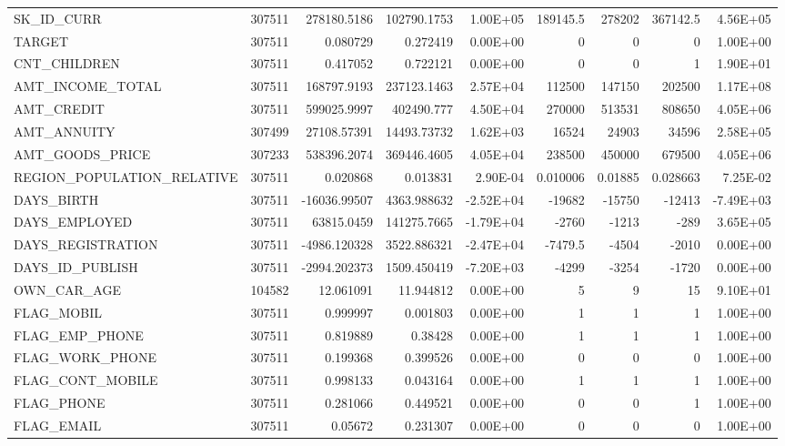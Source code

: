 \documentclass[12pt, letterpaper]{article}
\begin{document}
\begin{appendices}
{\begin{longtable}[c]{| l || r | r | r | r | r | r | r | r |}
 \hline
 \endfoot

 \hline
 \endlastfoot

 SK_ID_CURR	&	307511	&	278180.5186	&	102790.1753	&	1.00E+05	&	189145.5	&	278202	&	367142.5	&	4.56E+05	\\
 TARGET	&	307511	&	0.080729	&	0.272419	&	0.00E+00	&	0	&	0	&	0	&	1.00E+00	\\
 CNT_CHILDREN	&	307511	&	0.417052	&	0.722121	&	0.00E+00	&	0	&	0	&	1	&	1.90E+01	\\
 AMT_INCOME_TOTAL	&	307511	&	168797.9193	&	237123.1463	&	2.57E+04	&	112500	&	147150	&	202500	&	1.17E+08	\\
 AMT_CREDIT	&	307511	&	599025.9997	&	402490.777	&	4.50E+04	&	270000	&	513531	&	808650	&	4.05E+06	\\
 AMT_ANNUITY	&	307499	&	27108.57391	&	14493.73732	&	1.62E+03	&	16524	&	24903	&	34596	&	2.58E+05	\\
 AMT_GOODS_PRICE	&	307233	&	538396.2074	&	369446.4605	&	4.05E+04	&	238500	&	450000	&	679500	&	4.05E+06	\\
 REGION_POPULATION_RELATIVE	&	307511	&	0.020868	&	0.013831	&	2.90E-04	&	0.010006	&	0.01885	&	0.028663	&	7.25E-02	\\
 DAYS_BIRTH	&	307511	&	-16036.99507	&	4363.988632	&	-2.52E+04	&	-19682	&	-15750	&	-12413	&	-7.49E+03	\\
 DAYS_EMPLOYED	&	307511	&	63815.0459	&	141275.7665	&	-1.79E+04	&	-2760	&	-1213	&	-289	&	3.65E+05	\\
 DAYS_REGISTRATION	&	307511	&	-4986.120328	&	3522.886321	&	-2.47E+04	&	-7479.5	&	-4504	&	-2010	&	0.00E+00	\\
 DAYS_ID_PUBLISH	&	307511	&	-2994.202373	&	1509.450419	&	-7.20E+03	&	-4299	&	-3254	&	-1720	&	0.00E+00	\\
 OWN_CAR_AGE	&	104582	&	12.061091	&	11.944812	&	0.00E+00	&	5	&	9	&	15	&	9.10E+01	\\
 FLAG_MOBIL	&	307511	&	0.999997	&	0.001803	&	0.00E+00	&	1	&	1	&	1	&	1.00E+00	\\
 FLAG_EMP_PHONE	&	307511	&	0.819889	&	0.38428	&	0.00E+00	&	1	&	1	&	1	&	1.00E+00	\\
 FLAG_WORK_PHONE	&	307511	&	0.199368	&	0.399526	&	0.00E+00	&	0	&	0	&	0	&	1.00E+00	\\
 FLAG_CONT_MOBILE	&	307511	&	0.998133	&	0.043164	&	0.00E+00	&	1	&	1	&	1	&	1.00E+00	\\
 FLAG_PHONE	&	307511	&	0.281066	&	0.449521	&	0.00E+00	&	0	&	0	&	1	&	1.00E+00	\\
 FLAG_EMAIL	&	307511	&	0.05672	&	0.231307	&	0.00E+00	&	0	&	0	&	0	&	1.00E+00	\\

\end{longtable}}
\end{appendices}
\end{document}
